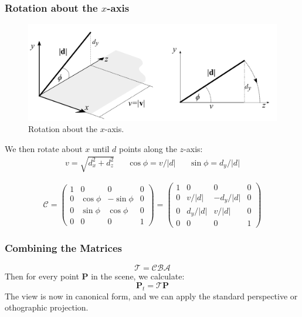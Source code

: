 \documentclass[11pt]{article}
\begin{document}
\subsubsection{Rotation about the $x$-axis}
\begin{figure}[h]
  \caption{Rotation about the $x$-axis.}
  \includegraphics[scale=0.2]{rotx}
  \centering
\end{figure}

We then rotate about $x$ until $d$ points along the $z$-axis:
\begin{align*}
  v = \sqrt{d_x^2 + d_z^2} && \cos \phi = v / \lvert d \rvert && \sin \phi = d_y / \lvert d \rvert
\end{align*}

\[
  \mathcal{C} =
  \begin{pmatrix}
    1 & 0 & 0 & 0 \\
    0 & \cos \phi & -\sin \phi & 0 \\
    0 & \sin \phi & \cos \phi & 0 \\
    0 & 0 & 0 & 1
  \end{pmatrix}
  =
  \begin{pmatrix}
    1 & 0 & 0 & 0 \\
    0 & v / \lvert d \rvert & -d_y / \lvert d \rvert & 0 \\
    0 & d_y / \lvert d \rvert & v / \lvert d \rvert & 0 \\
    0 & 0 & 0 & 1
  \end{pmatrix}
\]

\subsubsection{Combining the Matrices}
\[
  \mathcal{T} = \mathcal{CBA}  
\]
Then for every point $\textbf{P}$ in the scene, we calculate:
\[
  \textbf{P}_t = \mathcal{T}\textbf{P}  
\]
The view is now in canonical form, and we can apply the standard perspective or othographic projection.
\end{document}
